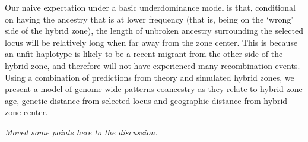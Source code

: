\documentclass[12pt]{article}
\newcommand{\alisa}[1]{{\em \color{red} #1}}
\begin{document}
Our naive expectation under a basic underdominance model is that, conditional on having the ancestry that is at lower frequency (that is, being on the `wrong' side of the hybrid zone), the length of unbroken ancestry surrounding the selected locus will be relatively long when far away from the zone center. This is because an unfit haplotype is likely to be a recent migrant from the other side of the hybrid zone, and therefore will not have experienced many recombination events. Using a combination of predictions from theory and simulated hybrid zones, we present a model of genome-wide patterns coancestry as they relate to hybrid zone age, genetic distance from selected locus and geographic distance from hybrid zone center. 

\alisa{Moved some points here to the discussion.}




\end{document}
